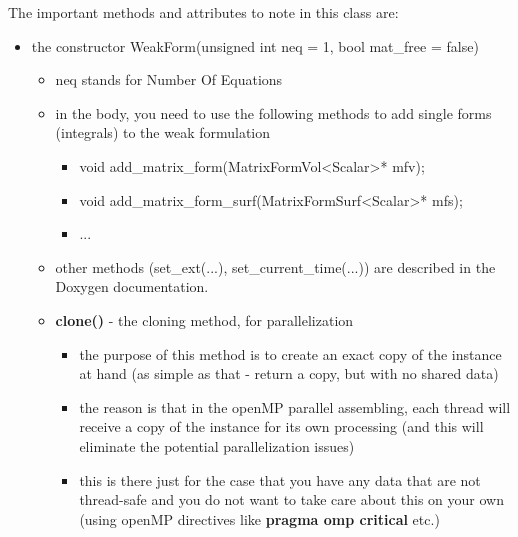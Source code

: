 \documentclass[a4paper,0pt,english]{sphinxmanual}
\begin{document}
The important methods and attributes to note in this class are:
\begin{itemize}
\item {} 
the constructor WeakForm(unsigned int neq = 1, bool mat\_free = false)
\begin{itemize}
\item {} 
neq stands for Number Of Equations

\item {} 
in the body, you need to use the following methods to add single forms (integrals) to the weak formulation
\begin{itemize}
\item {} 
void add\_matrix\_form(MatrixFormVol\textless{}Scalar\textgreater{}* mfv);

\item {} 
void add\_matrix\_form\_surf(MatrixFormSurf\textless{}Scalar\textgreater{}* mfs);

\item {} 
...

\end{itemize}

\item {} 
other methods (set\_ext(...), set\_current\_time(...)) are described in the Doxygen documentation.

\item {} 
\textbf{clone()} - the cloning method, for parallelization
\begin{itemize}
\item {} 
the purpose of this method is to create an exact copy of the instance at hand (as simple as that - return a copy, but with no shared data)

\item {} 
the reason is that in the openMP parallel assembling, each thread will receive a copy of the instance for its own processing (and this will eliminate the potential parallelization issues)

\item {} 
this is there just for the case that you have any data that are not thread-safe and you do not want to take care about this on your own (using openMP directives like \textbf{pragma omp critical} etc.)

\end{itemize}

\end{itemize}

\end{itemize}
\end{document}
